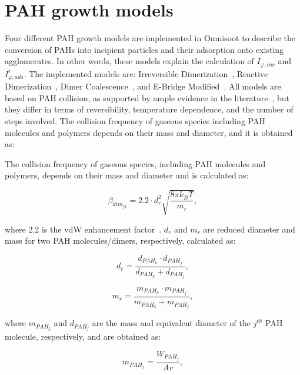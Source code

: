 
\section{PAH growth models}
\label{sec:pahgrowmodel}

Four different PAH growth models are implemented in Omnisoot to describe the conversion of PAHs into incipient particles and their adsorption onto existing agglomerates. In other words, these models explain the calculation of $I_{\varphi, inc}$ and $I^i_{\varphi, ads}$. The implemented models are: Irreversible Dimerization~\cite{frenklach1991detailed}, Reactive Dimerization~\citep{kholghy2018reactive}, Dimer Coalescence~\citep{blanquart2009joint}, and E-Bridge Modified~\citep{frenklach2020mechanism}. All models are based on PAH collision, as supported by ample evidence in the literature~\citep{zhao2003measurement, abid2009quantitative, happold2009soot}, but they differ in terms of reversibility, temperature dependence, and the number of steps involved. The collision frequency of gaseous species including PAH molecules and polymers depends on their mass and diameter, and it is obtained as:

The collision frequency of gaseous species, including PAH molecules and polymers, depends on their mass and diameter and is calculated as:

\begin{equation}
	\beta_{dim_{jk}}=
	2.2 \cdot d^2_{r} \sqrt{\frac{8 \pi k_B T}{m_{r}}},
	\label{eqn:betadim}
\end{equation}

\noindent where 2.2 is the vdW enhancement factor~\citep{kholghy2018reactive}. ${d_{r}}$ and ${m_{r}}$ are reduced diameter and mass for two PAH molecules/dimers, respectively, calculated as:

\begin{equation}
	d_{r}=
	\frac{d_{{PAH}_k}\cdot d_{{PAH}_j}}{d_{{PAH}_k}+d_{{PAH}_j}},
	\label{eqn:drPAH}
\end{equation}

\begin{equation}
	m_{r}=
	\frac{m_{{PAH}_k}\cdot m_{{PAH}_j}}{m_{{PAH}_k}+ m_{{PAH}_j}},
	\label{eqn:mrPAH}
\end{equation}

\noindent where $m_{PAH_j}$ and $d_{PAH_j}$ are the mass and equivalent diameter of the ${j}^{th}$ PAH molecule, respectively, and are obtained as:

\begin{equation}
	m_{PAH_j}=
	\frac{W_{{PAH}_j}}{Av},
	\label{eqn:mPAH}
\end{equation}

